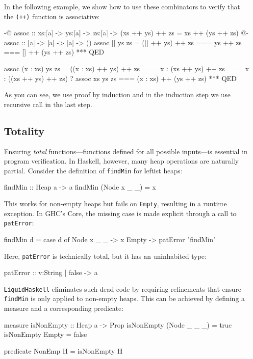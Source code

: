 In the following example, we show how to use these combinators to verify that the \texttt{(++)} function is associative:


\begin{code}[label=lst:associative]
	{-@ assoc :: xs:[a] -> ys:[a] -> zs:[a]
	-> { (xs ++ ys) ++ zs = xs ++ (ys ++ zs) } @-}
	assoc :: [a] -> [a] -> [a] -> ()
	assoc [] ys zs = ([] ++ ys) ++ zs
	=== ys ++ zs
	=== [] ++ (ys ++ zs)
	*** QED

	assoc (x : xs) ys zs = ((x : xs) ++ ys) ++ zs
	===  x : (xs ++ ys) ++ zs
	=== x : ((xs ++ ys) ++ zs) ? assoc xs ys zs
	=== (x : xs) ++ (ys ++ zs)
	*** QED
\end{code}
\vspace{1em}

As you can see, we use proof by induction and in the induction step we use recursive call in the last step.

\subsection{Totality}
Ensuring \emph{total} functions—functions defined for all possible inputs—is essential in program verification.
In Haskell, however, many heap operations are naturally partial.
Consider the definition of \texttt{findMin} for leftist heaps:

\begin{code}
	findMin :: Heap a -> a
	findMin (Node x _ _) = x
\end{code}

This works for non-empty heaps but fails on \texttt{Empty}, resulting in a runtime exception.
In GHC’s Core, the missing case is made explicit through a call to \texttt{patError}:

\begin{code}
	findMin d = case d of
	Node x _ _ -> x
	Empty -> patError "findMin"
\end{code}

Here, \texttt{patError} is technically total, but it has an uninhabited type:

\begin{code}
	patError :: {v:String | false} -> a
\end{code}

\texttt{LiquidHaskell} eliminates such dead code by requiring refinements that ensure \texttt{findMin} is only applied to non-empty heaps.
This can be achieved by defining a measure and a corresponding predicate:

\begin{code}
	measure isNonEmpty :: Heap a -> Prop
	isNonEmpty (Node _ _ _) = true
	isNonEmpty Empty = false

	predicate NonEmp H = isNonEmpty H
\end{code}

